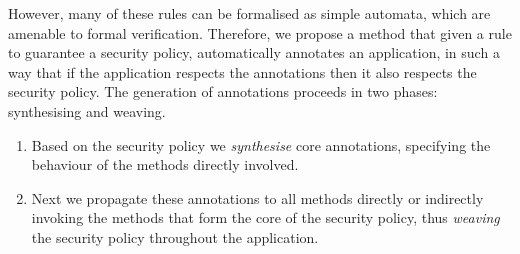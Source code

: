 However, many of these rules can be formalised as simple automata,
which are amenable to formal verification. Therefore, we propose a
method that given a rule to guarantee a security policy, automatically
annotates an application, in such a way that if the application
respects the annotations then it also respects the security
policy. The generation of annotations proceeds in two phases:
synthesising and weaving.
\begin{enumerate}
\item Based on the security policy we \emph{synthesise} core annotations, 
specifying the behaviour of the methods directly involved.
\item Next we propagate these annotations to all methods directly or
indirectly invoking the methods that form the core of the security
policy, thus \emph{weaving} the security policy throughout the
application. 
\end{enumerate} 
